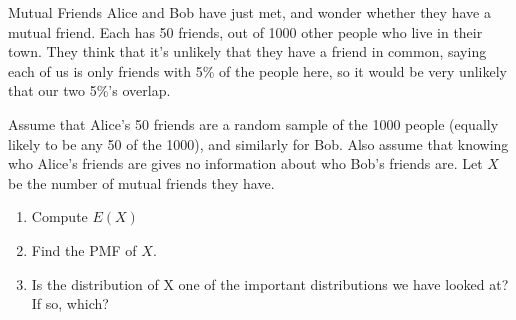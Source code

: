 \documentclass[11pt]{article}
\begin{document}
\begin{exercise}{Mutual Friends}
Alice and Bob have just met, and wonder whether they have a mutual friend. Each has 50 friends, out of 1000 other people who live in their town. They think that it's unlikely that they have a friend in common, saying each of us is only friends with 5\% of the people here, so it would be very unlikely that our two 5\%'s overlap.

Assume that Alice's 50 friends are a random sample of the 1000 people (equally likely to be any 50 of the 1000), and similarly for Bob. Also assume that knowing who Alice's friends are gives no information about who Bob's friends are. Let $X$ be the number of mutual friends they have. 
\begin{enumerate}
\item Compute $E(X)$ 
\item Find the PMF of $X$.
\item Is the distribution of X one of the important distributions we have looked at? If so, which?
\end{enumerate}
\end{exercise}
\end{document}
